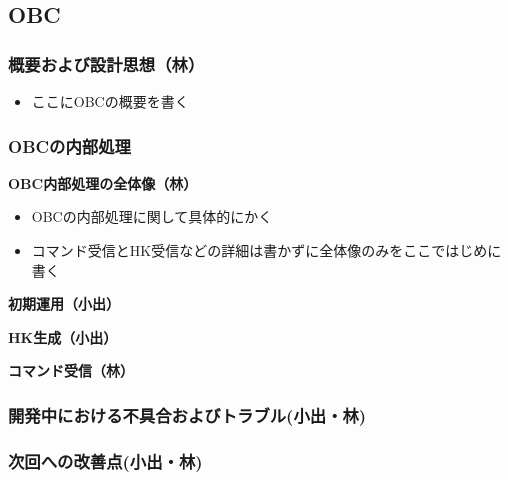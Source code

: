 
\subsection{OBC}
\subsubsection{概要および設計思想（林）}
\begin{itemize}
	\item ここにOBCの概要を書く
\end{itemize}
\subsubsection{OBCの内部処理}
\textbf{OBC内部処理の全体像（林）}\par
\begin{itemize}
	\item OBCの内部処理に関して具体的にかく
	\item コマンド受信とHK受信などの詳細は書かずに全体像のみをここではじめに書く
\end{itemize}
\textbf{初期運用（小出）}\par
\textbf{HK生成（小出）}\par
\textbf{コマンド受信（林）}\par
\subsubsection{開発中における不具合およびトラブル(小出・林)}
\subsubsection{次回への改善点(小出・林)}
